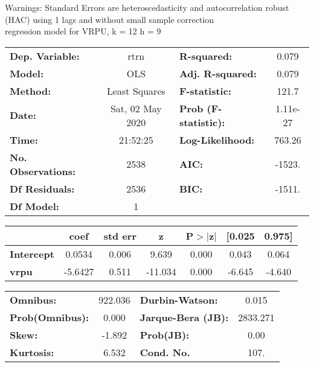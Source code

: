 Warnings: \newline
 [1] Standard Errors are heteroscedasticity and autocorrelation robust (HAC) using 1 lags and without small sample correction\\ 

regression model for VRPU, k = 12 h = 9\begin{center}
\begin{tabular}{lclc}
\toprule
\textbf{Dep. Variable:}    &       rtrn       & \textbf{  R-squared:         } &     0.079   \\
\textbf{Model:}            &       OLS        & \textbf{  Adj. R-squared:    } &     0.079   \\
\textbf{Method:}           &  Least Squares   & \textbf{  F-statistic:       } &     121.7   \\
\textbf{Date:}             & Sat, 02 May 2020 & \textbf{  Prob (F-statistic):} &  1.11e-27   \\
\textbf{Time:}             &     21:52:25     & \textbf{  Log-Likelihood:    } &    763.26   \\
\textbf{No. Observations:} &        2538      & \textbf{  AIC:               } &    -1523.   \\
\textbf{Df Residuals:}     &        2536      & \textbf{  BIC:               } &    -1511.   \\
\textbf{Df Model:}         &           1      & \textbf{                     } &             \\
\bottomrule
\end{tabular}
\begin{tabular}{lcccccc}
                   & \textbf{coef} & \textbf{std err} & \textbf{z} & \textbf{P$> |$z$|$} & \textbf{[0.025} & \textbf{0.975]}  \\
\midrule
\textbf{Intercept} &       0.0534  &        0.006     &     9.639  &         0.000        &        0.043    &        0.064     \\
\textbf{vrpu}      &      -5.6427  &        0.511     &   -11.034  &         0.000        &       -6.645    &       -4.640     \\
\bottomrule
\end{tabular}
\begin{tabular}{lclc}
\textbf{Omnibus:}       & 922.036 & \textbf{  Durbin-Watson:     } &    0.015  \\
\textbf{Prob(Omnibus):} &   0.000 & \textbf{  Jarque-Bera (JB):  } & 2833.271  \\
\textbf{Skew:}          &  -1.892 & \textbf{  Prob(JB):          } &     0.00  \\
\textbf{Kurtosis:}      &   6.532 & \textbf{  Cond. No.          } &     107.  \\
\bottomrule
\end{tabular}
\end{center}

